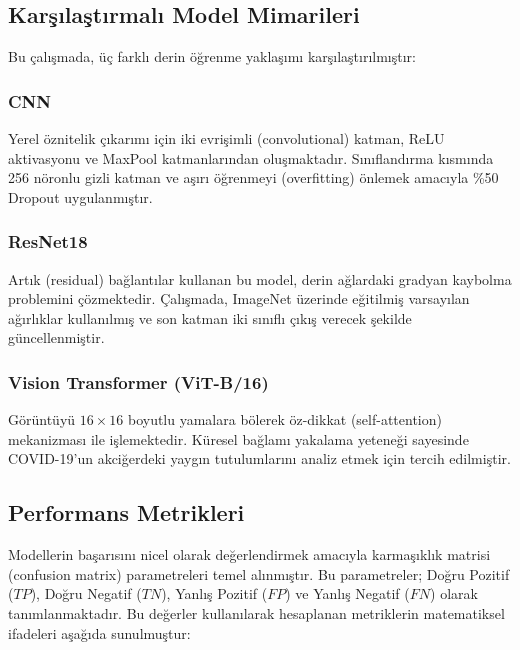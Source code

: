 \documentclass[conference]{IEEEtran}
\begin{document}
\subsection{Karşılaştırmalı Model Mimarileri}
Bu çalışmada, üç farklı derin öğrenme yaklaşımı karşılaştırılmıştır:

\subsubsection{\textbf{CNN}}
Yerel öznitelik çıkarımı için iki evrişimli (convolutional) katman, ReLU aktivasyonu ve MaxPool katmanlarından oluşmaktadır. Sınıflandırma kısmında 256 nöronlu gizli katman ve aşırı öğrenmeyi (overfitting) önlemek amacıyla \%50 Dropout uygulanmıştır.

\subsubsection{\textbf{ResNet18}}
Artık (residual) bağlantılar kullanan bu model, derin ağlardaki gradyan kaybolma problemini çözmektedir. Çalışmada, ImageNet üzerinde eğitilmiş varsayılan ağırlıklar kullanılmış ve son katman iki sınıflı çıkış verecek şekilde güncellenmiştir.

\subsubsection{\textbf{Vision Transformer (ViT-B/16)}}
Görüntüyü $16 \times 16$ boyutlu yamalara bölerek öz-dikkat (self-attention) mekanizması ile işlemektedir. Küresel bağlamı yakalama yeteneği sayesinde COVID-19'un akciğerdeki yaygın tutulumlarını analiz etmek için tercih edilmiştir.

\subsection{Performans Metrikleri}
Modellerin başarısını nicel olarak değerlendirmek amacıyla karmaşıklık matrisi (confusion matrix) parametreleri temel alınmıştır. Bu parametreler; Doğru Pozitif ($TP$), Doğru Negatif ($TN$), Yanlış Pozitif ($FP$) ve Yanlış Negatif ($FN$) olarak tanımlanmaktadır. Bu değerler kullanılarak hesaplanan metriklerin matematiksel ifadeleri aşağıda sunulmuştur:
\end{document}
